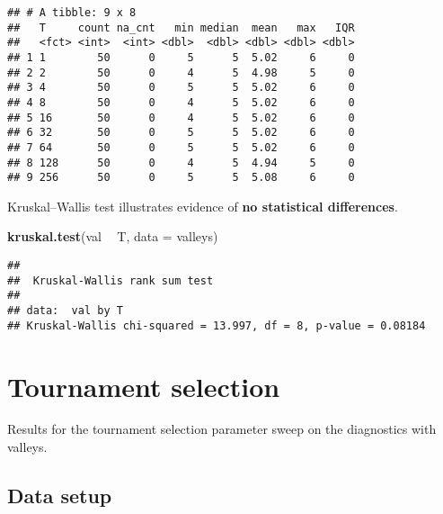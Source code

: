 \documentclass[]{book}
\newenvironment{Shaded}{\begin{snugshade}}{\end{snugshade}}
\newcommand{\DataTypeTok}[1]{\textcolor[rgb]{0.13,0.29,0.53}{#1}}
\newcommand{\KeywordTok}[1]{\textcolor[rgb]{0.13,0.29,0.53}{\textbf{#1}}}
\newcommand{\NormalTok}[1]{#1}
\newcommand{\OperatorTok}[1]{\textcolor[rgb]{0.81,0.36,0.00}{\textbf{#1}}}
\newcommand{\StringTok}[1]{\textcolor[rgb]{0.31,0.60,0.02}{#1}}
\begin{document}
\begin{verbatim}
## # A tibble: 9 x 8
##   T     count na_cnt   min median  mean   max   IQR
##   <fct> <int>  <int> <dbl>  <dbl> <dbl> <dbl> <dbl>
## 1 1        50      0     5      5  5.02     6     0
## 2 2        50      0     4      5  4.98     5     0
## 3 4        50      0     5      5  5.02     6     0
## 4 8        50      0     4      5  5.02     6     0
## 5 16       50      0     4      5  5.02     6     0
## 6 32       50      0     5      5  5.02     6     0
## 7 64       50      0     5      5  5.02     6     0
## 8 128      50      0     4      5  4.94     5     0
## 9 256      50      0     5      5  5.08     6     0
\end{verbatim}

Kruskal--Wallis test illustrates evidence of \textbf{no statistical differences}.

\begin{Shaded}
\begin{Highlighting}[]
\KeywordTok{kruskal.test}\NormalTok{(val }\OperatorTok{~}\StringTok{ }\NormalTok{T, }\DataTypeTok{data =}\NormalTok{ valleys)}
\end{Highlighting}
\end{Shaded}

\begin{verbatim}
## 
##  Kruskal-Wallis rank sum test
## 
## data:  val by T
## Kruskal-Wallis chi-squared = 13.997, df = 8, p-value = 0.08184
\end{verbatim}

\hypertarget{tournament-selection}{%
\chapter{Tournament selection}\label{tournament-selection}}

Results for the tournament selection parameter sweep on the diagnostics with valleys.

\hypertarget{data-setup-1}{%
\section{Data setup}\label{data-setup-1}}
\end{document}
